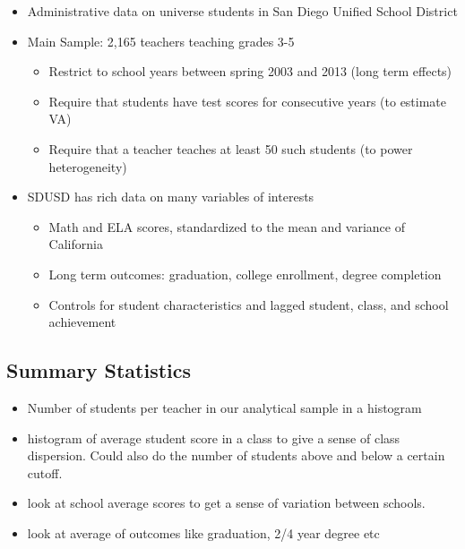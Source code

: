 \documentclass{article}
\theoremstyle{definition}
\theoremstyle{definition}
\theoremstyle{definition}
\theoremstyle{definition}
\begin{document}
\begin{itemize}
    \item Administrative data on universe students in San Diego Unified School District

    \item Main Sample: 2,165 teachers teaching grades 3-5
        
    \begin{itemize}
        \item Restrict to school years between spring 2003 and 2013 (long term effects)
        \item Require that students have test scores for consecutive years (to estimate VA)
        \item Require that a teacher teaches at least 50 such students (to power heterogeneity)
    \end{itemize}    
        
    \item SDUSD has rich data on many variables of interests
        \begin{itemize}
        \item Math and ELA scores, standardized to the mean and variance of California
        \item Long term outcomes: graduation, college enrollment, degree completion
        \item Controls for student characteristics and lagged student, class, and school achievement
    \end{itemize}  
\end{itemize}

    \subsection{Summary Statistics}
    \begin{itemize}
        \item Number of students per teacher in our analytical sample in a histogram 
        \item histogram of average student score in a class to give a sense of class dispersion. Could also do the number of students above and below a certain cutoff. 
        \item look at school average scores to get a sense of variation between schools. 
        \item look at average of outcomes like graduation, 2/4 year degree etc
    \end{itemize}
\end{document}
